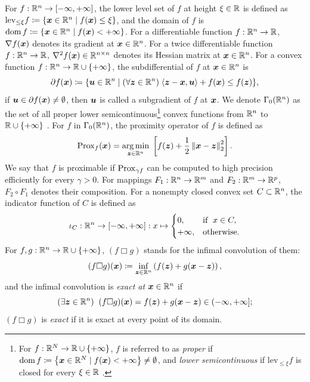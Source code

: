 \documentclass[lettersize,journal]{IEEEtran}
\theoremstyle{plain}%
\theoremstyle{definition}
\theoremstyle{remark}
\begin{document}
For $f:\mathbb{R}^n\to[-\infty,+\infty]$, the lower level set of $f$ at height $\xi\in\mathbb{R}$ is defined as $\mathrm{lev}_{\leq \xi}f\coloneqq\left\{ \bm{x}\in\mathbb{R}^n\mid f(\bm{x})\leq \xi \right\}$, and the domain of $f$ is $\textrm{dom\,}{f}\coloneqq\left\{ \bm{x}\in\mathbb{R}^n\mid f(\bm{x})<+\infty \right\}$. For a differentiable function $f:\mathbb{R}^{n}\to\mathbb{R}$, $\nabla f(\bm{x})$ denotes its gradient at $\bm{x}\in\mathbb{R}^n$. For a twice differentiable function $f:\mathbb{R}^n\to\mathbb{R}$, $\nabla^2 f(\bm{x})\in\mathbb{R}^{n\times n}$ denotes its Hessian matrix at $\bm{x}\in\mathbb{R}^n$. For a convex function $f:\mathbb{R}^n\to\mathbb{R}\cup\left\{ +\infty \right\}$, the subdifferential of $f$ at $\bm{x}\in\mathbb{R}^n$ is
\begin{equation*}
\partial f(\bm{x})\coloneqq\{\bm{u}\in\mathbb{R}^n\mid(\forall \bm{z}\in\mathbb{R}^n)\;\langle \bm{z}-\bm{x}, \bm{u} \rangle+f(\bm{x})\leq f(\bm{z})\},
\end{equation*}
if $\bm{u}\in\partial f(\bm{x})\neq\emptyset$, then $\bm{u}$ is called a subgradient of $f$ at $\bm{x}$. We denote $\Gamma_0(\mathbb{R}^n)$ as the set of all proper lower semicontinuous\footnote{For $f:\mathbb{R}^N\to\mathbb{R}\cup\{+\infty\}$, $f$ is referred to as \textit{proper} if $\textrm{dom\,}{f}\coloneqq \left\{ \bm{x}\in\mathbb{R}^N\mid f(\bm{x})<+\infty \right\}\neq \emptyset$, and \textit{lower semicontinuous} if $\mathrm{lev}_{\leq \xi}f$ is closed for every $\xi\in\mathbb{R}$ \cite[Thm. 2.6]{beck2017}.} convex functions from $\mathbb{R}^n$ to $\mathbb{R}\cup\left\{ +\infty \right\}$ \cite{bauschke2017}. For $f$ in $\Gamma_0(\mathbb{R}^n)$, the proximity operator of $f$ is defined as
\begin{equation*}
\mathrm{Prox}_{f}(\bm{x})=\underset{\bm{z}\in\mathbb{R}^n}{\mathrm{arg\,min}}\; \left[ f(\bm{z})+\frac{1}{2}\left\| \bm{x}-\bm{z} \right\|_2^2 \right].
\end{equation*}
We say that $f$ is proximable if $\mathrm{Prox}_{\gamma f}$ can be computed to high precision efficiently for every $\gamma>0$. For mappings $F_1:\mathbb{R}^n\to\mathbb{R}^m$ and $F_2:\mathbb{R}^m\to\mathbb{R}^p$, $F_2\circ F_1$ denotes their composition. For a nonempty closed convex set $C\subset \mathbb{R}^n$, the indicator function of $C$ is defined as
\begin{equation*}
\iota_C:\mathbb{R}^n\to[-\infty,+\infty]:x\mapsto\begin{cases}
0, & \mathrm{if }\;\; x\in C,\\
+\infty, & \mathrm{otherwise.}
\end{cases}
\end{equation*}
For $f,g:\mathbb{R}^n\to\mathbb{R}\cup\{+\infty\}$, $(f\Box g)$ stands for the infimal convolution \cite{bauschke2017} of them:
\begin{equation}
(f\Box g)(\bm{x})\coloneqq \inf_{\bm{z}\in\mathbb{R}^n} \left( f(\bm{z})+g(\bm{x}-\bm{z}) \right ),
\end{equation}
and the infimal convolution is \textit{exact at} $\bm{x}\in\mathbb{R}^n$ if
\begin{equation*}
(\exists \bm{z}\in\mathbb{R}^n)\;\; (f\Box g)(\bm{x})=f(\bm{z})+g(\bm{x}-\bm{z})\in (-\infty,+\infty];
\end{equation*}
$(f\Box g)$ is \textit{exact} if it is exact at every point of its domain.
\end{document}

